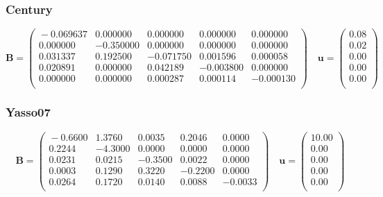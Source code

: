\documentclass[draft,linenumbers]{agujournal}
\begin{document}
\subsubsection*{Century}
\begin{equation}
\mathbf{B} =
\begin{pmatrix}{}
  -0.069637 & 0.000000 & 0.000000 & 0.000000 & 0.000000 \\ 
  0.000000 & -0.350000 & 0.000000 & 0.000000 & 0.000000 \\ 
  0.031337 & 0.192500 & -0.071750 & 0.001596 & 0.000058 \\ 
  0.020891 & 0.000000 & 0.042189 & -0.003800 & 0.000000 \\ 
  0.000000 & 0.000000 & 0.000287 & 0.000114 & -0.000130 \\ 
  \end{pmatrix}
\quad {\bm u} =
\begin{pmatrix}{}
  0.08 \\ 
  0.02 \\ 
  0.00 \\ 
  0.00 \\ 
  0.00 \\ 
  \end{pmatrix}
\end{equation}

\subsubsection*{Yasso07}
\begin{equation}
\mathbf{B} =
\begin{pmatrix}{}
  -0.6600 & 1.3760 & 0.0035 & 0.2046 & 0.0000 \\ 
  0.2244 & -4.3000 & 0.0000 & 0.0000 & 0.0000 \\ 
  0.0231 & 0.0215 & -0.3500 & 0.0022 & 0.0000 \\ 
  0.0003 & 0.1290 & 0.3220 & -0.2200 & 0.0000 \\ 
  0.0264 & 0.1720 & 0.0140 & 0.0088 & -0.0033 \\ 
  \end{pmatrix}
\quad {\bm u} =
\begin{pmatrix}{}
  10.00 \\ 
  0.00 \\ 
  0.00 \\ 
  0.00 \\ 
  0.00 \\ 
  \end{pmatrix}
\end{equation}
\end{document}
